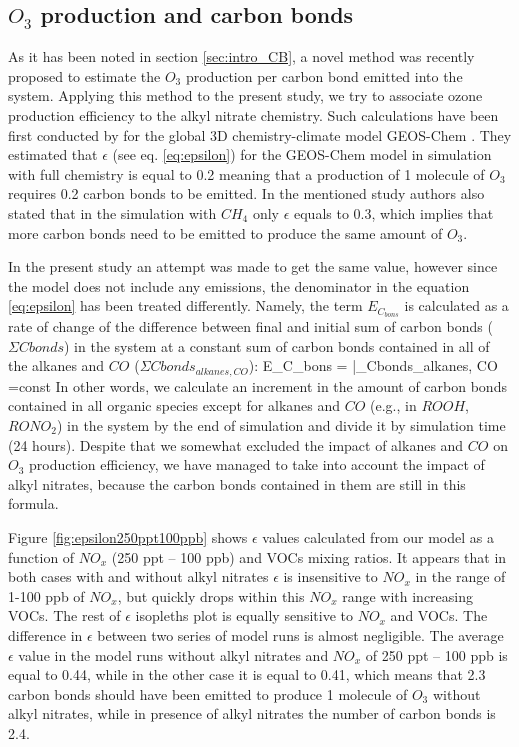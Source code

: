 \documentclass[11pt,a4paper]{article}
\newcounter{matriz}
\newenvironment{matriz}{\refstepcounter{matriz}\equation}{\tag{\thematriz}\endequation}
\begin{document}
\subsection{$O_3$ production and carbon bonds} \label{sec:res_O3ANCB}
As it has been noted in section \ref{sec:intro_CB}, a novel method was recently proposed to estimate the $O_3$ production per carbon bond emitted into the system. Applying this method to the present study, we try to associate ozone production efficiency to the alkyl nitrate chemistry. Such calculations have been first conducted by \cite{Evans2014} for the global 3D chemistry-climate model GEOS-Chem \citep{Bey2001}. They estimated that $\epsilon$ (see eq. \ref{eq:epsilon}) for the GEOS-Chem model in simulation with full chemistry is equal to 0.2 meaning that a production of 1 molecule of $O_3$ requires 0.2 carbon bonds to be emitted. In the mentioned study authors also stated that in the simulation with $CH_4$ only $\epsilon$ equals to 0.3, which implies that more carbon bonds need to be emitted to produce the same amount of $O_3$.

In the present study an attempt was made to get the same value, however since the model does not include any emissions, the denominator in the equation \ref{eq:epsilon} has been treated differently. Namely, the term $E_{C_{bons}}$ is calculated as a rate of change of the difference between final and initial sum of carbon bonds ($\Sigma Cbonds$) in the system at a constant sum of carbon bonds contained in all of the alkanes and $CO$ ($\Sigma Cbonds_{alkanes, CO}$): 
\begin{matriz} \label{eq:ECbonds}
E_{C_{bons}} = {}\bigg|_{\Sigma Cbonds_{alkanes, CO} =const}
\end{matriz}
In other words, we calculate an increment in the amount of carbon bonds contained in all organic species except for alkanes and $CO$ (e.g., in $ROOH$, $RONO_2$) in the system by the end of simulation and divide it by simulation time (24 hours). Despite that we somewhat excluded the impact of alkanes and $CO$ on $O_3$ production efficiency, we have managed to take into account the impact of alkyl nitrates, because the carbon bonds contained in them are still in this formula.

Figure \ref{fig:epsilon250ppt100ppb} shows $\epsilon$ values calculated from our model as a function of $NO_x$ (250 ppt -- 100 ppb) and VOCs mixing ratios. It appears that in both cases with and without alkyl nitrates $\epsilon$ is insensitive to $NO_x$ in the range of 1-100 ppb of $NO_x$, but quickly drops within this $NO_x$ range with increasing VOCs. The rest of $\epsilon$ isopleths plot is equally sensitive to $NO_x$ and VOCs. The difference in $\epsilon$ between two series of model runs is almost negligible. The average $\epsilon$ value in the model runs without alkyl nitrates and $NO_x$ of 250 ppt -- 100 ppb is equal to 0.44, while in the other case it is equal to 0.41, which means that 2.3 carbon bonds should have been emitted to produce 1 molecule of $O_3$ without alkyl nitrates, while in presence of alkyl nitrates the number of carbon bonds is 2.4.
\end{document}
